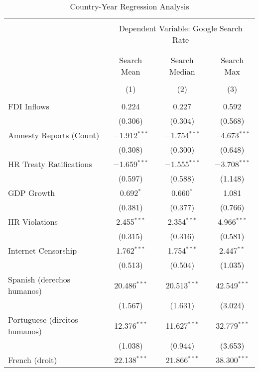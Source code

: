 
\begin{table}[!htbp] \centering 
  \caption{Country-Year Regression Analysis} 
  \label{} 
\begin{tabular}{@{\extracolsep{5pt}}lccc} 
\\[-1.8ex]\hline 
\hline \\[-1.8ex] 
 & \multicolumn{3}{c}{Dependent Variable: Google Search Rate} \\ 
\cline{2-4} 
\\[-1.8ex] & \multicolumn{3}{c}{ } \\ 
 & Search Mean & Search Median & Search Max \\ 
\\[-1.8ex] & (1) & (2) & (3)\\ 
\hline \\[-1.8ex] 
 FDI Inflows & 0.224 & 0.227 & 0.592 \\ 
  & (0.306) & (0.304) & (0.568) \\ 
  Amnesty Reports (Count) & $-$1.912$^{***}$ & $-$1.754$^{***}$ & $-$4.673$^{***}$ \\ 
  & (0.308) & (0.300) & (0.648) \\ 
  HR Treaty Ratifications & $-$1.659$^{***}$ & $-$1.555$^{***}$ & $-$3.708$^{***}$ \\ 
  & (0.597) & (0.588) & (1.148) \\ 
  GDP Growth & 0.692$^{*}$ & 0.660$^{*}$ & 1.081 \\ 
  & (0.381) & (0.377) & (0.766) \\ 
  HR Violations & 2.455$^{***}$ & 2.354$^{***}$ & 4.966$^{***}$ \\ 
  & (0.315) & (0.316) & (0.581) \\ 
  Internet Censorship & 1.762$^{***}$ & 1.754$^{***}$ & 2.447$^{**}$ \\ 
  & (0.513) & (0.504) & (1.035) \\ 
  Spanish (derechos humanos) & 20.486$^{***}$ & 20.513$^{***}$ & 42.549$^{***}$ \\ 
  & (1.567) & (1.631) & (3.024) \\ 
  Portuguese (direitos humanos) & 12.376$^{***}$ & 11.627$^{***}$ & 32.779$^{***}$ \\ 
  & (1.038) & (0.944) & (3.653) \\ 
  French (droit) & 22.138$^{***}$ & 21.866$^{***}$ & 38.300$^{***}$ \\ 

\end{tabular}
\end{table}
